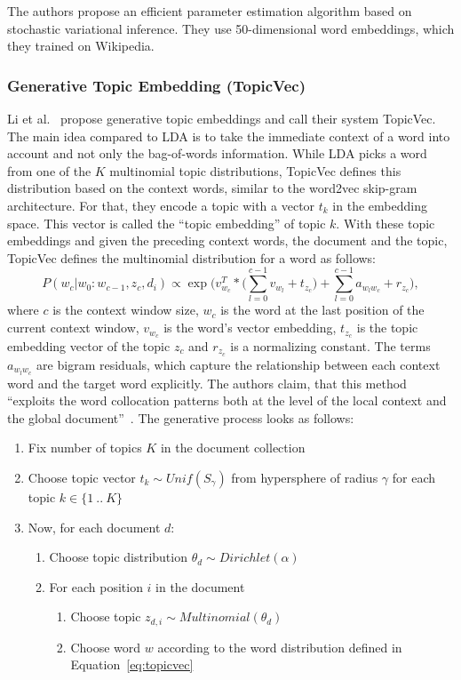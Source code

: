 \documentclass[
        a4paper,
        titlepage,
        twoside,
        parskip,
        numbers=noenddot
        ]{scrbook}
\theoremstyle{break}
\begin{document}
The authors propose an efficient parameter estimation algorithm based on stochastic variational inference.
They use 50-dimensional word embeddings, which they trained on Wikipedia.

\subsubsection{Generative Topic Embedding (TopicVec)}
Li et al.~\cite{Li2016} propose generative topic embeddings and call their system TopicVec.
The main idea compared to LDA is to take the immediate context of a word into account and not only the bag-of-words information.
While LDA picks a word from one of the $K$ multinomial topic distributions, TopicVec defines this distribution based on the context words, similar to the word2vec skip-gram architecture.
For that, they encode a topic with a vector $t_k$ in the embedding space.
This vector is called the ``topic embedding'' of topic $k$.
With these topic embeddings and given the preceding context words, the document and the topic, TopicVec defines the multinomial distribution for a word as follows:
\begin{equation}
  \label{eq:topicvec}
  P(w_c | w_0 : w_{c - 1}, z_c, d_i) \propto \exp \bigg( v_{w_{c}}^T * \Big( \sum\limits_{l=0}^{c-1} v_{w_l} + t_{z_c} \Big) + \sum\limits_{l=0}^{c - 1} a_{w_{l} w_c}  + r_{z_c} \bigg),
\end{equation}
where $c$ is the context window size, $w_c$ is the word at the last position of the current context window, $v_{w_c}$ is the word's vector embedding, $t_{z_c}$ is the topic embedding vector of the topic $z_c$ and $r_{z_c}$ is a normalizing constant.
The terms $a_{w_l w_c}$ are bigram residuals, which capture the relationship between each context word and the target word explicitly.
The authors claim, that this method ``exploits the word collocation patterns both at the level of the local context and the global document''~\cite{Li2016}.
The generative process looks as follows:
\begin{enumerate}
    \item Fix number of topics $K$ in the document collection
    \item Choose topic vector $t_k \sim Unif(S_{\gamma})$ from hypersphere of radius $\gamma$ for each topic $k \in \{1~..~K\}$
    \item Now, for each document $d$:
    \begin{enumerate}
        \item Choose topic distribution $\theta_d \sim Dirichlet(\alpha)$
        \item For each position $i$ in the document
        \begin{enumerate}
            \item Choose topic $z_{d,i} \sim Multinomial(\theta_d)$
            \item Choose word $w$ according to the word distribution defined in Equation~\ref{eq:topicvec}
        \end{enumerate}
    \end{enumerate}
\end{enumerate}
\end{document}
